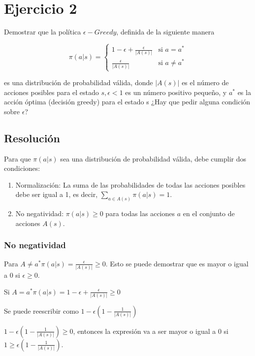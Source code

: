 \documentclass[12pt,a4paper]{article}
\begin{document}
\section{Ejercicio 2}

Demostrar que la política $\epsilon-Greedy$, definida de la siguiente manera

\begin{equation*}
    \pi(a|s) = 
    \begin{cases} 
      1 - \epsilon + \frac{\epsilon}{|A(s)|} & \text{si } a = a^* \\
      \frac{\epsilon}{|A(s)|} & \text{si } a \neq a^*
    \end{cases}
\end{equation*}

es una distribución de probabilidad válida, donde $|A(s)|$ es el número de acciones
posibles para el estado $s,\epsilon<1$ es un número positivo pequeño, y $a^*$ es la
acción óptima (decisión greedy) para el estado s ¿Hay que pedir alguna condición sobre
$\epsilon$?

\subsection{Resolución}

Para que $\pi(a|s)$ sea una distribución de probabilidad válida, debe cumplir dos condiciones:
\begin{enumerate}
    \item Normalización: La suma de las probabilidades de todas las acciones posibles debe ser igual a 1, es decir, $\sum_{a \in A(s)} \pi(a|s) = 1$.
    \item No negatividad: $\pi(a|s) \geq 0$ para todas las acciones $a$ en el conjunto de acciones $A(s)$.
\end{enumerate}

\subsubsection{No negatividad}

Para $A\neq a^* \pi(a|s) = \frac{\epsilon}{|A(s)|} \geq 0$.
Esto se puede demostrar que es mayor o igual a 0 si $\epsilon \geq 0$.

Si $A=a^* \pi(a|s) = 1-\epsilon + \frac{\epsilon}{|A(s)|} \geq 0$

Se puede reescribir como $1-\epsilon(1-\frac{1}{|A(s)|})$

$1-\epsilon(1-\frac{1}{|A(s)|}) \geq 0$, entonces la expresión va a ser mayor o
igual a 0 si $1\geq \epsilon(1-\frac{1}{|A(s)|})$.
\end{document}
